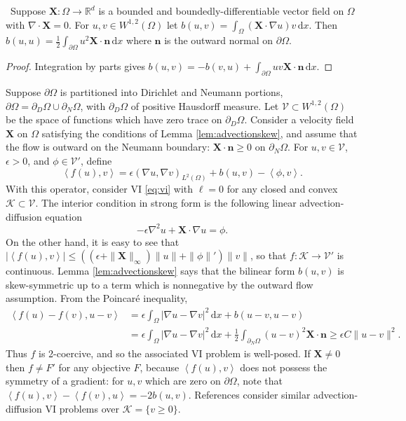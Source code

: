 \documentclass[review,hidelinks,onefignum,onetabnum]{siamart220329}
\newcommand{\eps}{\epsilon}
\newcommand{\RR}{\mathbb{R}}
\newcommand{\grad}{\nabla}
\newcommand{\Div}{\nabla\cdot}
\newcommand{\bn}{\mathbf{n}}
\newcommand{\bX}{\mathbf{X}}
\newcommand{\cK}{\mathcal{K}}
\newcommand{\cV}{\mathcal{V}}
\newcommand{\ip}[2]{\left<#1,#2\right>}
\newcommand{\dx}{\, \mathrm{d}x}
\begin{document}
\begin{lemma}  \label{lem:advectionskew}  \cite{Elmanetal2014}\,  Suppose $\bX :\Omega \to \RR^d$ is a bounded and boundedly-differentiable vector field on $\Omega$ with $\Div \bX=0$.  For $u,v \in W^{1,2}(\Omega)$ let $b(u,v) = \int_\Omega (\bX \cdot \grad u) v\dx$.  Then $b(u,u) = \frac{1}{2} \int_{\partial \Omega} u^2 \bX\cdot \bn\dx$ where $\bn$ is the outward normal on $\partial \Omega$.
\end{lemma}

\begin{proof}
Integration by parts gives $b(u,v) = - b(v,u) + \int_{\partial \Omega} uv \bX\cdot \bn\dx$.
\end{proof}

\begin{example}  \label{ex:advectiondiffusion}  Suppose $\partial\Omega$ is partitioned into Dirichlet and Neumann portions, $\partial\Omega = \partial_D\Omega \cup \partial_N\Omega$, with $\partial_D\Omega$ of positive Hausdorff measure.  Let $\cV \subset W^{1,2}(\Omega)$ be the space of functions which have zero trace on $\partial_D\Omega$.  Consider a velocity field $\bX$ on $\Omega$ satisfying the conditions of Lemma \ref{lem:advectionskew}, and assume that the flow is outward on the Neumann boundary: $\bX \cdot \bn \ge 0$ on $\partial_N\Omega$.  For $u,v \in \cV$, $\eps>0$, and $\phi \in \cV'$, define
\begin{equation}
\ip{f(u)}{v} = \eps \left(\grad u, \grad v\right)_{L^2(\Omega)} + b(u,v) - \ip{\phi}{v}. \label{eq:advectiondiffusion}
\end{equation}
With this operator, consider VI \eqref{eq:vi} with $\ell = 0$ for any closed and convex $\cK \subset \cV$. The interior condition in strong form is the following linear advection-diffusion equation
\begin{equation}
-\eps \grad^2 u + \bX\cdot \grad u = \phi.
\label{eq:advectiondiffusionstrong}
\end{equation}
On the other hand, it is easy to see that $|\!\ip{f(u)}{v}\!| \le \left((\eps + \|\bX\|_\infty) \|u\| + \|\phi\|'\right) \|v\|$, so that $f:\cK \to \cV'$ is continuous.  Lemma \ref{lem:advectionskew} says that the bilinear form $b(u,v)$ is skew-symmetric up to a term which is nonnegative by the outward flow assumption.  From the Poincar\'e inequality,
\begin{align*}
\ip{f(u)-f(v)}{u-v} &= \eps \int_\Omega |\grad u - \grad v|^2\dx + b(u-v,u-v) \\
                    &= \eps \int_\Omega |\grad u - \grad v|^2\dx + \frac{1}{2} \int_{\partial_N\Omega} (u-v)^2 \bX\cdot\bn \ge \eps C \|u-v\|^2.
\end{align*}
Thus $f$ is 2-coercive, and so the associated VI problem is well-posed. If $\bX \ne 0$ then $f\ne F'$ for any objective $F$, because $\ip{f(u)}{v}$ does not possess the symmetry of a gradient: for $u,v$ which are zero on $\partial \Omega$, note that $\ip{f(u)}{v} - \ip{f(v)}{u} = -2 b(u,v)$.  References \cite{Bueler2021conservation,ChangNakshatrala2017} consider similar advection-diffusion VI problems over $\cK = \{v\ge 0\}$. \end{example}
\end{document}
